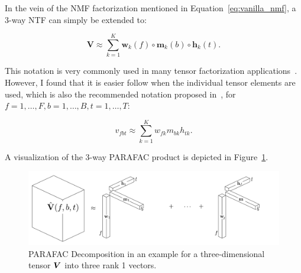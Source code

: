 In the vein of the NMF factorization mentioned in Equation~\ref{eq:vanilla_nmf}, a 3-way NTF can simply be extended to:

\begin{equation}
   \mathbf{V} \approx \sum\limits_{k=1}^{K} \mathbf{w}_{k}(f) \circ \mathbf{m}_{k}(b) \circ \mathbf{h}_{k}(t).
\end{equation}

This notation is very commonly used in many tensor factorization applications~\cite{kolda09}.
However, I found that it is easier follow when the individual tensor elements are used, which is also the recommended notation proposed in~\cite{kiers00}, for  $f = 1 , \ldots , F , b = 1 , \ldots , B , t = 1 , \ldots , T$:

\begin{equation}
  v_{fbt} \approx \sum_{k = 1}^{K} w_{fk} m_{bk} h_{tk}.
\end{equation}

A visualization of the 3-way PARAFAC product is depicted in Figure~\ref{fig:cpd}.

\begin{figure}[!t]
  \centering
  \includegraphics[width=1\textwidth]{Chapters/06_Separation_Unknown/figures/cpd.pdf}
  \caption{PARAFAC Decomposition in an example for a three-dimensional tensor \({\bm{V}}\) into three rank 1 vectors.}
  \label{fig:cpd}
\end{figure}

